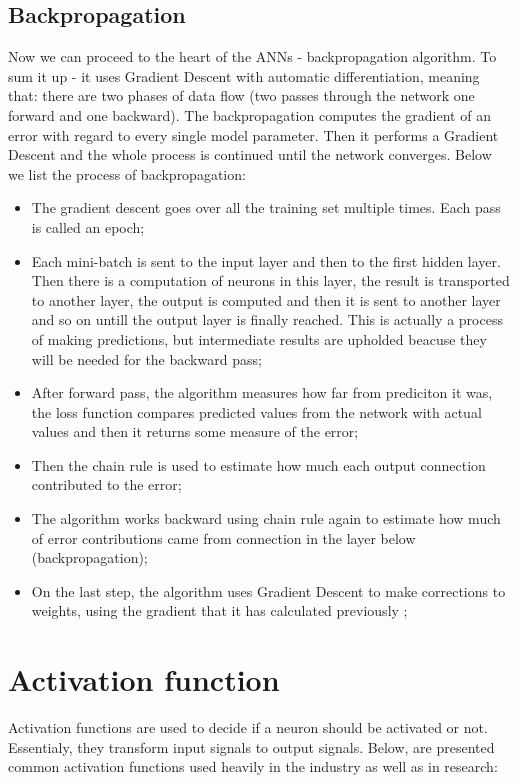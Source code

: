 \documentclass[a4paper,oneside,openright,11pt]{book}
\begin{document}
\subsection{Backpropagation}

Now we can proceed to the heart of the ANNs - backpropagation algorithm. To sum it up - it uses Gradient Descent with automatic differentiation, meaning that: there are two phases of data flow (two passes through the network one forward and one backward). The backpropagation computes the gradient of an error with regard to every single model parameter. Then it performs a Gradient Descent and the whole process is continued until the network converges. Below we list the process of backpropagation:


\begin{itemize}
    \item The gradient descent goes over all the training set multiple times. Each pass is called an epoch;
    \item Each mini-batch is sent to the input layer and then to the first hidden layer. Then there is a computation of neurons in this layer, the result is transported to another layer, the output is computed and then it is sent to another layer and so on untill the output layer is finally reached. This is actually a process of making predictions, but intermediate results are upholded beacuse they will be needed for the backward pass;
    \item After forward pass, the algorithm measures how far from prediciton it was, the loss function compares predicted values from the network with actual values and then it returns some measure of the error;
    \item Then the chain rule is used to estimate how much each output connection contributed to the error;
    \item The algorithm works backward using chain rule again to estimate how much of error contributions came from connection in the layer below (backpropagation);
    \item On the last step, the algorithm uses Gradient Descent to make corrections to weights, using the gradient that it has calculated previously \cite{aurelion};
\end{itemize}


\section{Activation function}

Activation functions are used to decide if a neuron should be activated or not. Essentialy, they transform input signals to output signals. Below, are presented common activation functions used heavily in the industry as well as in research:
\end{document}
